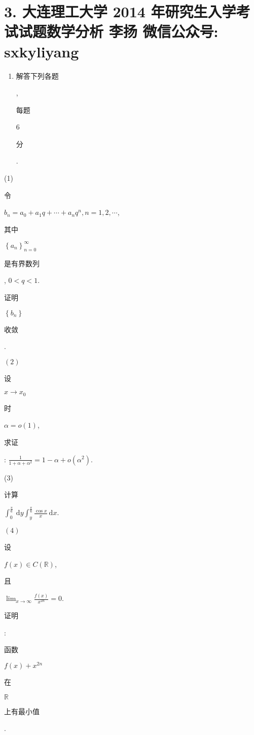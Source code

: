 \documentclass[10pt]{article}
\begin{document}
\section{3. 大连理工大学 2014 年研究生入学考试试题数学分析 
 李扬 
 微信公众号: sxkyliyang}
\begin{enumerate}
  \item \begin{CJK}{UTF8}{mj}解答下列各题\end{CJK}, \begin{CJK}{UTF8}{mj}每题\end{CJK} 6 \begin{CJK}{UTF8}{mj}分\end{CJK}.
\end{enumerate}
(1) \begin{CJK}{UTF8}{mj}令\end{CJK} $b_{n}=a_{0}+a_{1} q+\cdots+a_{n} q^{n}, n=1,2, \cdots$, \begin{CJK}{UTF8}{mj}其中\end{CJK} $\left\{a_{n}\right\}_{n=0}^{\infty}$ \begin{CJK}{UTF8}{mj}是有界数列\end{CJK}, $0<q<1$. \begin{CJK}{UTF8}{mj}证明\end{CJK} $\left\{b_{n}\right\}$ \begin{CJK}{UTF8}{mj}收敛\end{CJK}.

$(2)$ \begin{CJK}{UTF8}{mj}设\end{CJK} $x \rightarrow x_{0}$ \begin{CJK}{UTF8}{mj}时\end{CJK} $\alpha=o(1)$, \begin{CJK}{UTF8}{mj}求证\end{CJK}: $\frac{1}{1+\alpha+\alpha^{2}}=1-\alpha+o\left(\alpha^{2}\right)$.

(3) \begin{CJK}{UTF8}{mj}计算\end{CJK} $\int_{0}^{\frac{\pi}{6}} \mathrm{~d} y \int_{y}^{\frac{\pi}{6}} \frac{\cos x}{x} \mathrm{~d} x$.

$(4)$ \begin{CJK}{UTF8}{mj}设\end{CJK} $f(x) \in C(\mathbb{R})$, \begin{CJK}{UTF8}{mj}且\end{CJK} $\lim _{x \rightarrow \infty} \frac{f(x)}{x^{2 n}}=0$. \begin{CJK}{UTF8}{mj}证明\end{CJK}: \begin{CJK}{UTF8}{mj}函数\end{CJK} $f(x)+x^{2 n}$ \begin{CJK}{UTF8}{mj}在\end{CJK} $\mathbb{R}$ \begin{CJK}{UTF8}{mj}上有最小值\end{CJK}.
\end{document}
